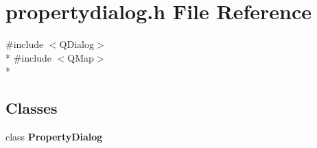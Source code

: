 \section{propertydialog.\+h File Reference}
\label{properties_2propertydialog_8h}
{\ttfamily \#include $<$Q\+Dialog$>$}\\*
{\ttfamily \#include $<$Q\+Map$>$}\\*
\subsection*{Classes}
\begin{DoxyCompactItemize}
\item 
class {\bf Property\+Dialog}
\end{DoxyCompactItemize}
